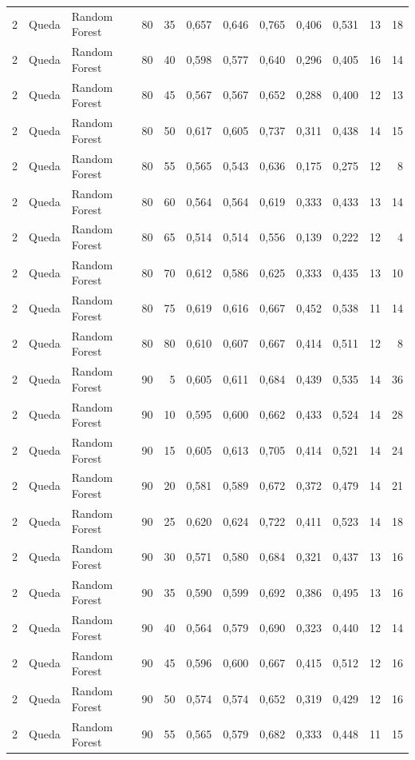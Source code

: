\begin{longtable}{@{}rllrrrrrrrrr@{}}
2 & Queda & Random Forest & 80 & 35 & 0,657 & 0,646 & 0,765 & 0,406 & 0,531 & 13 & 18 \\
2 & Queda & Random Forest & 80 & 40 & 0,598 & 0,577 & 0,640 & 0,296 & 0,405 & 16 & 14 \\
2 & Queda & Random Forest & 80 & 45 & 0,567 & 0,567 & 0,652 & 0,288 & 0,400 & 12 & 13 \\
2 & Queda & Random Forest & 80 & 50 & 0,617 & 0,605 & 0,737 & 0,311 & 0,438 & 14 & 15 \\
2 & Queda & Random Forest & 80 & 55 & 0,565 & 0,543 & 0,636 & 0,175 & 0,275 & 12 & 8 \\
2 & Queda & Random Forest & 80 & 60 & 0,564 & 0,564 & 0,619 & 0,333 & 0,433 & 13 & 14 \\
2 & Queda & Random Forest & 80 & 65 & 0,514 & 0,514 & 0,556 & 0,139 & 0,222 & 12 & 4 \\
2 & Queda & Random Forest & 80 & 70 & 0,612 & 0,586 & 0,625 & 0,333 & 0,435 & 13 & 10 \\
2 & Queda & Random Forest & 80 & 75 & 0,619 & 0,616 & 0,667 & 0,452 & 0,538 & 11 & 14 \\
2 & Queda & Random Forest & 80 & 80 & 0,610 & 0,607 & 0,667 & 0,414 & 0,511 & 12 & 8 \\
2 & Queda & Random Forest & 90 & 5 & 0,605 & 0,611 & 0,684 & 0,439 & 0,535 & 14 & 36 \\
2 & Queda & Random Forest & 90 & 10 & 0,595 & 0,600 & 0,662 & 0,433 & 0,524 & 14 & 28 \\
2 & Queda & Random Forest & 90 & 15 & 0,605 & 0,613 & 0,705 & 0,414 & 0,521 & 14 & 24 \\
2 & Queda & Random Forest & 90 & 20 & 0,581 & 0,589 & 0,672 & 0,372 & 0,479 & 14 & 21 \\
2 & Queda & Random Forest & 90 & 25 & 0,620 & 0,624 & 0,722 & 0,411 & 0,523 & 14 & 18 \\
2 & Queda & Random Forest & 90 & 30 & 0,571 & 0,580 & 0,684 & 0,321 & 0,437 & 13 & 16 \\
2 & Queda & Random Forest & 90 & 35 & 0,590 & 0,599 & 0,692 & 0,386 & 0,495 & 13 & 16 \\
2 & Queda & Random Forest & 90 & 40 & 0,564 & 0,579 & 0,690 & 0,323 & 0,440 & 12 & 14 \\
2 & Queda & Random Forest & 90 & 45 & 0,596 & 0,600 & 0,667 & 0,415 & 0,512 & 12 & 16 \\
2 & Queda & Random Forest & 90 & 50 & 0,574 & 0,574 & 0,652 & 0,319 & 0,429 & 12 & 16 \\
2 & Queda & Random Forest & 90 & 55 & 0,565 & 0,579 & 0,682 & 0,333 & 0,448 & 11 & 15 \\

\end{longtable}
